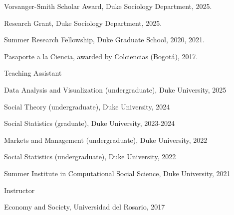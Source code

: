\documentclass[11pt,article,oneside]{memoir}
\begin{document}
\bigskip


\medskip

\ind Vorsanger-Smith Scholar Award, Duke Sociology Department, 2025.

\ind Research Grant, Duke Sociology Department, 2025.

\ind Summer Research Fellowship, Duke Graduate School, 2020, 2021.

\ind Pasaporte a la Ciencia, awarded by Colciencias (Bogotá), 2017.

\bigskip


\bigskip

\ind Teaching Assistant

\ind \hspace{0.35in} \footnotesize \textemdash Data Analysis and Visualization (undergraduate), Duke University, 2025

\ind \hspace{0.35in} \footnotesize \textemdash Social Theory (undergraduate), Duke University, 2024

\ind \hspace{0.35in} \textemdash Social Statistics (graduate), Duke University, 2023-2024

\ind \hspace{0.35in} \textemdash Markets and Management (undergraduate), Duke University, 2022

\ind \hspace{0.35in} \textemdash Social Statistics (undergraduate), Duke University, 2022

\ind \hspace{0.35in} \textemdash Summer Institute in Computational Social Science, Duke University, 2021

\normalsize \ind Instructor 

\footnotesize

\ind \hspace{0.35in} \textemdash Economy and Society, Universidad del Rosario, 2017
\end{document}

